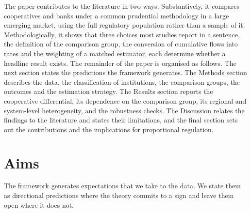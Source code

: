 \documentclass[11pt,a4paper]{article}
\begin{document}
The paper contributes to the literature in two ways. Substantively, it compares
cooperatives and banks under a common prudential methodology in a large emerging market,
using the full regulatory population rather than a sample of it. Methodologically, it
shows that three choices most studies report in a sentence, the definition of the
comparison group, the conversion of cumulative flows into rates and the weighting of a
matched estimator, each determine whether a headline result exists. The remainder of the
paper is organised as follows. The next section states the predictions the framework
generates. The Methods section describes the data, the classification of institutions,
the comparison groups, the outcomes and the estimation strategy. The Results section
reports the cooperative differential, its dependence on the comparison group, its
regional and system-level heterogeneity, and the robustness checks. The Discussion
relates the findings to the literature and states their limitations, and the final
section sets out the contributions and the implications for proportional regulation.

\section{Aims}


The framework generates expectations that we take to the data. We state them as
directional predictions where the theory commits to a sign and leave them open where it
does not.
\end{document}
